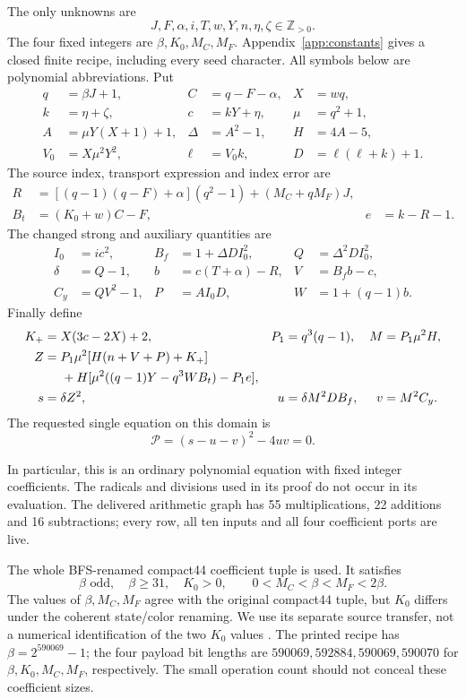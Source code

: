 \documentclass[11pt]{article}
\theoremstyle{remark}\newtheorem{remark}[theorem]{Remark}
\newcommand{\Zp}{\mathbb Z_{>0}}
\begin{document}
The only unknowns are
\[
J,F,\alpha,i,T,w,Y,n,\eta,\zeta\in\Zp.
\]
The four fixed integers are $\beta,K_0,M_C,M_F$. Appendix~\ref{app:constants}
gives a closed finite recipe, including every seed character. All symbols
below are polynomial abbreviations. Put
\begin{align*}
q&=\beta J+1,&C&=q-F-\alpha,&X&=wq,\\
k&=\eta+\zeta,&c&=kY+\eta,&\mu&=q^2+1,\\
A&=\mu Y(X+1)+1,&\Delta&=A^2-1,&H&=4A-5,\\
V_0&=X\mu^2Y^2,&\ell&=V_0k,&D&=\ell(\ell+k)+1.
\end{align*}
The source index, transport expression and index error are
\begin{align*}
R&=[(q-1)(q-F)+\alpha](q^2-1)+(M_C+qM_F)J,\\
B_t&=(K_0+w)C-F,& e&=k-R-1.
\end{align*}
The changed strong and auxiliary quantities are
\begin{align*}
I_0&=ic^2,& B_f&=1+\Delta D I_0^2,&Q&=\Delta^2 D I_0^2,\\
\delta&=Q-1,&b&=c(T+\alpha)-R,&V&=B_fb-c,\\
C_y&=QV^2-1,&P&=AI_0D,&W&=1+(q-1)b.
\end{align*}
Finally define
\begin{align*}
K_+&=X(3c-2X)+2, &P_1&=q^3(q-1), &M&=P_1\mu^2H,\\
Z&=P_1\mu^2[H(n+V+P)+K_+]\\
 &\hspace{1.4em}+H[\mu^2((q-1)Y-q^3WB_t)-P_1e],\\
s&=\delta Z^2,&u&=\delta M^2DB_f,&v&=M^2C_y.
\end{align*}
The requested single equation on this domain is
\begin{equation}\label{eq:main}
\boxed{\mathcal P=(s-u-v)^2-4uv=0.}
\end{equation}

In particular, this is an ordinary polynomial equation with fixed integer
coefficients. The radicals and divisions used in its proof do not occur in
its evaluation. The delivered arithmetic graph has 55 multiplications,
22 additions and 16 subtractions; every row, all ten inputs and all four
coefficient ports are live.

The whole BFS-renamed compact44 coefficient tuple is used. It satisfies
\begin{equation}\label{eq:portbox}
\beta\text{ odd},\quad\beta\ge31,\quad K_0>0,
\qquad 0<M_C<\beta<M_F<2\beta.
\end{equation}
The values of $\beta,M_C,M_F$ agree with the original compact44 tuple, but
$K_0$ differs under the coherent state/color renaming. We use its separate
source transfer, not a numerical identification of the two $K_0$ values
\cite{bfspage}. The printed recipe has
$\beta=2^{590069}-1$; the four payload bit lengths are
$590069,592884,590069,590070$ for $\beta,K_0,M_C,M_F$, respectively.
The small operation count should not conceal these coefficient sizes.
\end{document}
